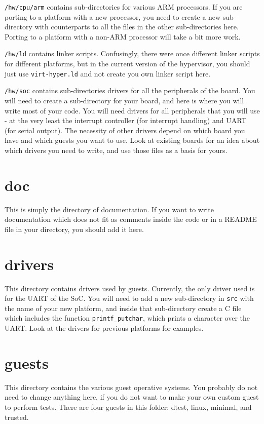 \documentclass[a4paper,11pt,reqno]{amsart}
\begin{document}
\texttt{/hw/cpu/arm} contains sub-directories for various ARM processors. If you are porting to a platform with a new processor, you need to create a new sub-directory with counterparts to all the files in the other sub-directories here. Porting to a platform with a non-ARM processor will take a bit more work.

\texttt{/hw/ld} contains linker scripts. Confusingly, there were once different linker scripts for different platforms, but in the current version of the hypervisor, you should just use \texttt{virt-hyper.ld} and not create you own linker script here.

\texttt{/hw/soc} contains sub-directories drivers for all the peripherals of the board. You will need to create a sub-directory for your board, and here is where you will write most of your code. You will need drivers for all peripherals that you will use - at the very least the interrupt controller (for interrupt handling) and UART (for serial output). The necessity of other drivers depend on which board you have and which guests you want to use. Look at existing boards for an idea about which drivers you need to write, and use those files as a basis for yours.

\section{doc}
This is simply the directory of documentation. If you want to write documentation which does not fit as comments inside the code or in a README file in your directory, you should add it here.

\section{drivers}
This directory contains drivers used by guests. Currently, the only driver used is for the UART of the SoC. You will need to add a new sub-directory in \texttt{src} with the name of your new platform, and inside that sub-directory create a C file which includes the function \texttt{printf_putchar}, which prints a character over the UART. Look at the drivers for previous platforms for examples.

\section{guests}
This directory contains the various guest operative systems. You probably do not need to change anything here, if you do not want to make your own custom guest to perform tests. There are four guests in this folder: dtest, linux, minimal, and trusted.
\end{document}
